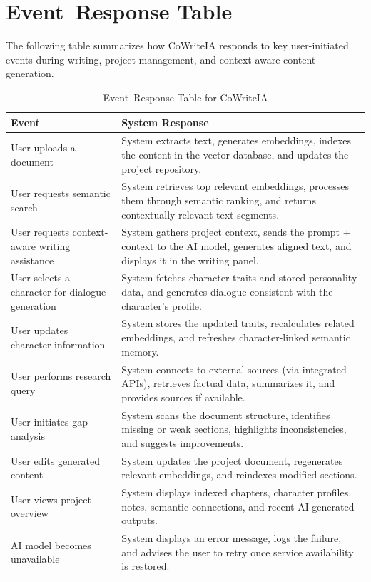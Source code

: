\section{Event--Response Table}

The following table summarizes how CoWriteIA responds to key user-initiated events during writing, project management, and context-aware content generation.

\begin{table}[H]
\centering
\renewcommand{\arraystretch}{1.3}
\begin{tabular}{p{4.2cm} p{10cm}}
\hline
\textbf{Event} & \textbf{System Response} \\
\hline

User uploads a document &
System extracts text, generates embeddings, indexes the content in the vector database, and updates the project repository. \\

User requests semantic search &
System retrieves top relevant embeddings, processes them through semantic ranking, and returns contextually relevant text segments. \\

User requests context-aware writing assistance &
System gathers project context, sends the prompt + context to the AI model, generates aligned text, and displays it in the writing panel. \\

User selects a character for dialogue generation &
System fetches character traits and stored personality data, and generates dialogue consistent with the character’s profile. \\

User updates character information &
System stores the updated traits, recalculates related embeddings, and refreshes character-linked semantic memory. \\

User performs research query &
System connects to external sources (via integrated APIs), retrieves factual data, summarizes it, and provides sources if available. \\

User initiates gap analysis &
System scans the document structure, identifies missing or weak sections, highlights inconsistencies, and suggests improvements. \\

User edits generated content &
System updates the project document, regenerates relevant embeddings, and reindexes modified sections. \\

User views project overview &
System displays indexed chapters, character profiles, notes, semantic connections, and recent AI-generated outputs. \\

AI model becomes unavailable &
System displays an error message, logs the failure, and advises the user to retry once service availability is restored. \\
\hline
\end{tabular}
\caption{Event--Response Table for CoWriteIA}
\end{table}



